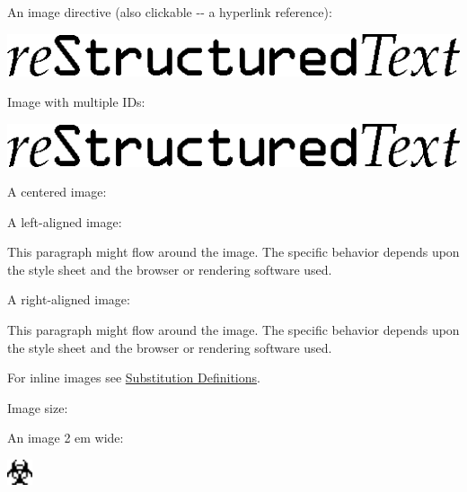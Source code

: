 \documentclass[a4paper]{article}
\begin{document}
An image directive (also clickable -{}- a hyperlink reference):

\hyperref[directives]{\includegraphics{../../../docs/user/rst/images/title.png}}

Image with multiple IDs:

\includegraphics{../../../docs/user/rst/images/title.png}
\label{image-target-3}\label{image-target-2}\label{image-target-1}

A centered image:

\noindent{}

A left-aligned image:


This paragraph might flow around the image.
The specific behavior depends upon the style sheet and
the browser or rendering software used.

A right-aligned image:


This paragraph might flow around the image.
The specific behavior depends upon the style sheet and
the browser or rendering software used.

For inline images see \hyperref[substitution-definitions]{Substitution Definitions}.

Image size:

An image 2 em wide:

\includegraphics[width=2em]{../../../docs/user/rst/images/biohazard.png}
\end{document}
